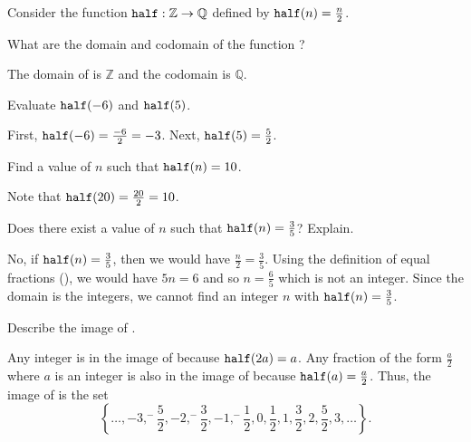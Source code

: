 \begin{exam}
\label{exam_fn_multiletter_name}
    Consider the function $\texttt{half}: \mathbb{Z} \to \mathbb{Q}$ defined by $\texttt{half}(n) = \frac{n}{2}$.
        \begin{apart}
            \item What are the domain and codomain of the function ?
                \begin{soln}
                    The domain of  is $\mathbb{Z}$ and the codomain is $\mathbb{Q}$.
                \end{soln}
            \item Evaluate $\texttt{half}(-6)$ and $\texttt{half}(5)$.
                \begin{soln}
                    First, $\texttt{half}(-6) = \frac{-6}{2} = -3$.  Next, $\texttt{half}(5) = \frac{5}{2}$.
                \end{soln}
            \item Find a value of $n$ such that $\texttt{half}(n) = 10$.
                \begin{soln}
                    Note that $\texttt{half}(20) = \frac{20}{2} = 10$.
                \end{soln}            
            \item Does there exist a value of $n$ such that $\texttt{half}(n)=\frac{3}{5}$?  Explain.
                \begin{soln}
                    No, if $\texttt{half}(n) = \frac{3}{5}$, then we would have $\frac{n}{2} = \frac{3}{5}$.  Using the definition of equal fractions (), we would have $5n = 6$ and so $n = \frac{6}{5}$ which is not an integer.  Since the domain is the integers, we cannot find an integer $n$ with $\texttt{half}(n)= \frac{3}{5}$.
                \end{soln}
            \item Describe the image of .
                \begin{soln}
                    Any integer is in the image of  because $\texttt{half}(2a) = a$.  Any fraction of the form $\frac{a}{2}$ where $a$ is an integer is also in the image of  because $\texttt{half}(a) = \frac{a}{2}$.  Thus, the image of  is the set 
                        $$\left\{ \ldots, -3, ^-\frac{5}{2},-2,^-\frac{3}{2},  -1, ^-\frac{1}{2}, 0, \frac{1}{2}, 1, \frac{3}{2}, 2, \frac{5}{2}, 3, \ldots\right\}.$$
                \end{soln}  
        \end{apart}
\end{exam}


